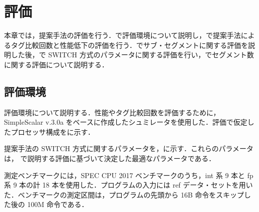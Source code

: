 
\chapter{評価}
\label{sec:eval}
本章では，提案手法の評価を行う．で評価環境について説明し，で提案手法によるタグ比較回数と性能低下の評価を行う．でサブ・セグメントに関する評価を説明した後，で SWITCH 方式のパラメータに関する評価を行い，でセグメント数に関する評価について説明する．

\section{評価環境}
\label{sec:eval_env}
評価環境について説明する．性能やタグ比較回数を評価するために，SimpleScalar v.3.0a をベースに作成したシュミレータを使用した．評価で仮定したプロセッサ構成をに示す．

提案手法の SWITCH 方式に関するパラメータを，に示す．これらのパラメータは， で説明する評価に基づいて決定した最適なパラメータである．

測定ベンチマークには，SPEC CPU 2017 ベンチマークのうち，int 系 9 本と fp 系 9 本の計 18 本を使用した．プログラムの入力には ref データ・セットを用いた．ベンチマークの測定区間は，プログラムの先頭から 16B 命令をスキップした後の 100M 命令である．

